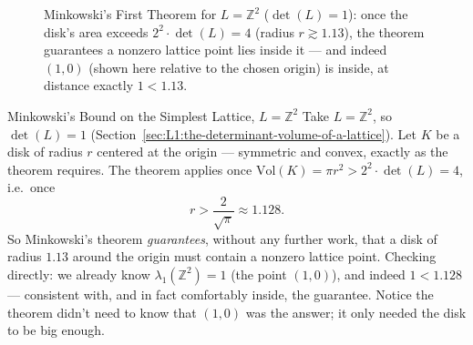 \begin{figure}[ht]
\centering
{}
\caption{Minkowski's First Theorem for $L = \mathbb{Z}^2$ ($\det(L)=1$): once the disk's area exceeds $2^2 \cdot \det(L) = 4$ (radius $r \gtrsim 1.13$), the theorem guarantees a nonzero lattice point lies inside it --- and indeed $(1,0)$ (shown here relative to the chosen origin) is inside, at distance exactly $1 < 1.13$.}
\label{fig:minkowski-disk}
\end{figure}

\begin{exbox}{Minkowski's Bound on the Simplest Lattice, $L = \mathbb{Z}^2$}
Take $L = \mathbb{Z}^2$, so $\det(L) = 1$ (Section~\ref{sec:L1:the-determinant-volume-of-a-lattice}). Let $K$ be a disk of radius $r$ centered at the origin --- symmetric and convex, exactly as the theorem requires. The theorem applies once $\mathrm{Vol}(K) = \pi r^2 > 2^2 \cdot \det(L) = 4$, i.e.\ once
$$
r > \frac{2}{\sqrt{\pi}} \approx 1.128.
$$
So Minkowski's theorem \emph{guarantees}, without any further work, that a disk of radius $1.13$ around the origin must contain a nonzero lattice point. Checking directly: we already know $\lambda_1(\mathbb{Z}^2) = 1$ (the point $(1,0)$), and indeed $1 < 1.128$ --- consistent with, and in fact comfortably inside, the guarantee. Notice the theorem didn't need to know that $(1,0)$ was the answer; it only needed the disk to be big enough.
\end{exbox}

